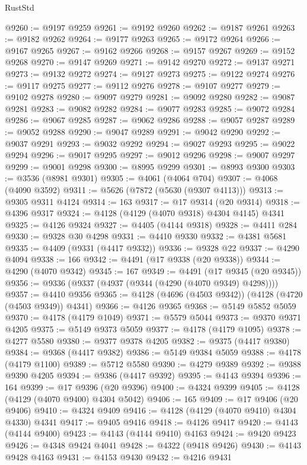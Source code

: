 \begin{lexlean}{RustStd}
\begin{coremodule}
@9260 := @9197 @9259
@9261 := @9192 @9260
@9262 := @9187 @9261
@9263 := @9182 @9262
@9264 := @9177 @9263
@9265 := @9172 @9264
@9266 := @9167 @9265
@9267 := @9162 @9266
@9268 := @9157 @9267
@9269 := @9152 @9268
@9270 := @9147 @9269
@9271 := @9142 @9270
@9272 := @9137 @9271
@9273 := @9132 @9272
@9274 := @9127 @9273
@9275 := @9122 @9274
@9276 := @9117 @9275
@9277 := @9112 @9276
@9278 := @9107 @9277
@9279 := @9102 @9278
@9280 := @9097 @9279
@9281 := @9092 @9280
@9282 := @9087 @9281
@9283 := @9082 @9282
@9284 := @9077 @9283
@9285 := @9072 @9284
@9286 := @9067 @9285
@9287 := @9062 @9286
@9288 := @9057 @9287
@9289 := @9052 @9288
@9290 := @9047 @9289
@9291 := @9042 @9290
@9292 := @9037 @9291
@9293 := @9032 @9292
@9294 := @9027 @9293
@9295 := @9022 @9294
@9296 := @9017 @9295
@9297 := @9012 @9296
@9298 := @9007 @9297
@9299 := @9001 @9298
@9300 := @8995 @9299
@9301 := @8993 @9300
@9303 := @3536 (@8981 @9301)
@9305 := @4061 (@4064 @704)
@9307 := @4068 (@4090 @3592)
@9311 := @5626 (@7872 (@5630 (@9307 @4113)))
@9313 := @9305 @9311 @4124
@9314 := 163
@9317 := @17 @9314 (@20 @9314)
@9318 := @4396 @9317
@9324 := @4128 (@4129 (@4070 @9318) @4304 @4145) @4341
@9325 := @4126 @9324
@9327 := @4405 (@4144 @9318)
@9328 := @4411 @284
@9330 := @9328 @30 @4298
@9331 := @4410 @9330
@9332 := @4381 @5681
@9335 := @4409 (@9331 (@4417 @9332))
@9336 := @9328 @22
@9337 := @4290 @4094
@9338 := 166
@9342 := @4491 (@17 @9338 (@20 @9338))
@9344 := @4290 (@4070 @9342)
@9345 := 167
@9349 := @4491 (@17 @9345 (@20 @9345))
@9356 := @9336 (@9337 (@4937 (@9344 (@4290 (@4070 @9349) @4298))))
@9357 := @4410 @9356
@9365 := @4128 (@4696 (@4503 @9342)) (@4128 (@4720 (@4503 @9349)) @4341)
@9366 := @4126 @9365
@9368 := @5149 @5852 @5059
@9370 := @4178 (@4179 @1049)
@9371 := @5579 @5044
@9373 := @9370 @9371 @4205
@9375 := @5149 @9373 @5059
@9377 := @4178 (@4179 @1095)
@9378 := @4277 @5580
@9380 := @9377 @9378 @4205
@9382 := @9375 (@4417 @9380)
@9384 := @9368 (@4417 @9382)
@9386 := @5149 @9384 @5059
@9388 := @4178 (@4179 @1100)
@9389 := @5712 @5580
@9390 := @4279 @9389
@9392 := @9388 @9390 @4205
@9394 := @9386 (@4417 @9392)
@9395 := @4143 @9394
@9396 := 164
@9399 := @17 @9396 (@20 @9396)
@9400 := @4324 @9399
@9405 := @4128 (@4129 (@4070 @9400) @4304 @5042)
@9406 := 165
@9409 := @17 @9406 (@20 @9406)
@9410 := @4324 @9409
@9416 := @4128 (@4129 (@4070 @9410) @4304 @4330) @4341
@9417 := @9405 @9416
@9418 := @4126 @9417
@9420 := @4143 (@4144 @9400)
@9423 := @4143 (@4144 @9410) @4163
@9424 := @9420 @9423
@9426 := @4348 @9424 @4041
@9428 := @4322 (@9418 @9426)
@9430 := @4143 @9428 @4163
@9431 := @4153 @9430
@9432 := @4216 @9431

\end{coremodule}
\end{lexlean}
